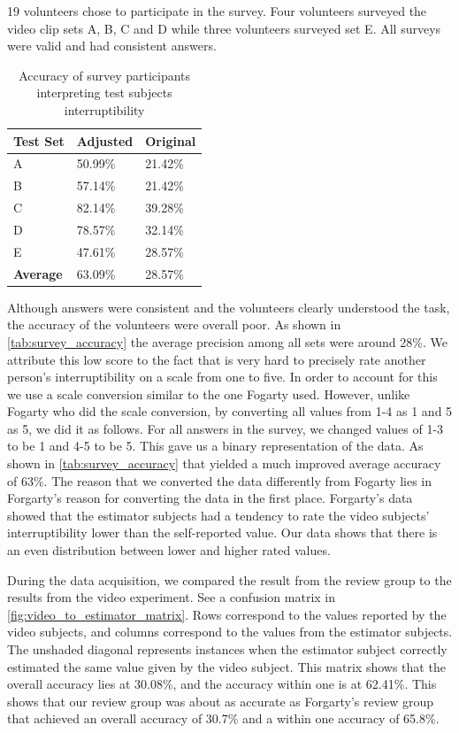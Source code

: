 \documentclass{sigchi}
\begin{document}
19 volunteers chose to participate in the survey.
Four volunteers surveyed the video clip sets A, B, C and D while three volunteers surveyed set E.
All surveys were valid and had consistent answers.

\begin{table}[h]
  \centering
  \begin{tabular}{@{}lll@{}}
    \toprule
    \textbf{Test Set}     & Adjusted & Original \\ \midrule
    A       & 50.99\%    & 21.42\%    \\
    B       & 57.14\%    & 21.42\%    \\
    C       & 82.14\%    & 39.28\%    \\
    D       & 78.57\%    & 32.14\%    \\
    E       & 47.61\%    & 28.57\%    \\ \midrule
    \textbf{Average} & 63.09\%    & 28.57\%    \\ \bottomrule
  \end{tabular}
  \caption{Accuracy of survey participants interpreting test subjects interruptibility}
  \label{tab:survey_accuracy}
\end{table}

Although answers were consistent and the volunteers clearly understood the task, the accuracy of the volunteers were overall poor.
As shown in \autoref{tab:survey_accuracy} the average precision among all sets were around 28\%.
We attribute this low score to the fact that is very hard to precisely rate another person's interruptibility on a scale from one to five.
In order to account for this we use a scale conversion similar to the one Fogarty used.
However, unlike Fogarty who did the scale conversion, by converting all values from 1-4 as 1 and 5 as 5, we did it as follows. For all answers in the survey, we changed values of 1-3 to be 1 and 4-5 to be 5.
This gave us a binary representation of the data.
As shown in \autoref{tab:survey_accuracy} that yielded a much improved average accuracy of 63\%.
The reason that we converted the data differently from Fogarty lies in Forgarty's reason for converting the data in the first place.
Forgarty's data showed that the estimator subjects had a tendency to rate the video subjects' interruptibility lower than the self-reported value.
Our data shows that there is an even distribution between lower and higher rated values.

During the data acquisition, we compared the result from the review group to the results from the video experiment.
See a confusion matrix in \autoref{fig:video_to_estimator_matrix}.
Rows correspond to the values reported by the video subjects, and columns correspond to the values from the estimator subjects.
The unshaded diagonal represents instances when the estimator subject correctly estimated the same value given by the video subject.
This matrix shows that the overall accuracy lies at 30.08\%, and the accuracy within one is at 62.41\%.
This shows that our review group was about as accurate as Forgarty's review group \cite{fogarty2005predicting} that achieved an overall accuracy of 30.7\% and a within one accuracy of 65.8\%.
\end{document}
